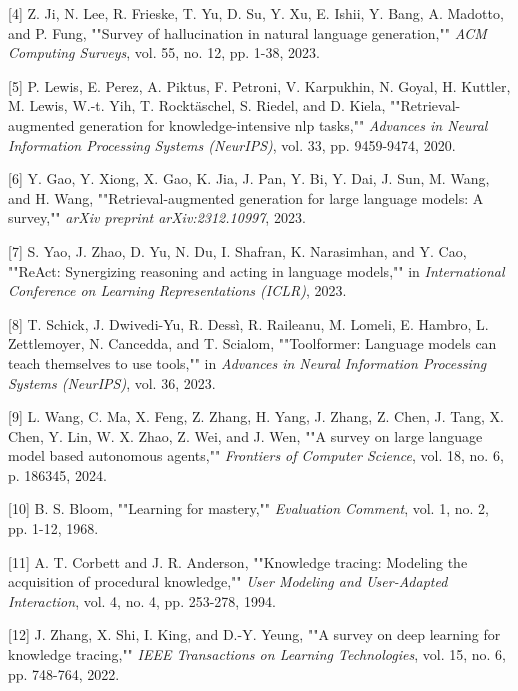 \documentclass[12pt,a4paper]{article}
\begin{document}
{[}4{]}	Z. Ji, N. Lee, R. Frieske, T. Yu, D. Su, Y. Xu, E. Ishii, Y. Bang, A. Madotto, and P. Fung, ""Survey of hallucination in natural language generation,"" \textit{ACM Computing Surveys}, vol. 55, no. 12, pp. 1-38, 2023.



{[}5{]}	P. Lewis, E. Perez, A. Piktus, F. Petroni, V. Karpukhin, N. Goyal, H. Kuttler, M. Lewis, W.-t. Yih, T. Rocktäschel, S. Riedel, and D. Kiela, ""Retrieval-augmented generation for knowledge-intensive nlp tasks,"" \textit{Advances in Neural Information Processing Systems (NeurIPS)}, vol. 33, pp. 9459-9474, 2020.



{[}6{]}	Y. Gao, Y. Xiong, X. Gao, K. Jia, J. Pan, Y. Bi, Y. Dai, J. Sun, M. Wang, and H. Wang, ""Retrieval-augmented generation for large language models: A survey,"" \textit{arXiv preprint arXiv:2312.10997}, 2023.



{[}7{]}	S. Yao, J. Zhao, D. Yu, N. Du, I. Shafran, K. Narasimhan, and Y. Cao, ""ReAct: Synergizing reasoning and acting in language models,"" in \textit{International Conference on Learning Representations (ICLR)}, 2023.



{[}8{]}	T. Schick, J. Dwivedi-Yu, R. Dessì, R. Raileanu, M. Lomeli, E. Hambro, L. Zettlemoyer, N. Cancedda, and T. Scialom, ""Toolformer: Language models can teach themselves to use tools,"" in \textit{Advances in Neural Information Processing Systems (NeurIPS)}, vol. 36, 2023.



{[}9{]}	L. Wang, C. Ma, X. Feng, Z. Zhang, H. Yang, J. Zhang, Z. Chen, J. Tang, X. Chen, Y. Lin, W. X. Zhao, Z. Wei, and J. Wen, ""A survey on large language model based autonomous agents,"" \textit{Frontiers of Computer Science}, vol. 18, no. 6, p. 186345, 2024.



{[}10{]}	B. S. Bloom, ""Learning for mastery,"" \textit{Evaluation Comment}, vol. 1, no. 2, pp. 1-12, 1968.



{[}11{]}	A. T. Corbett and J. R. Anderson, ""Knowledge tracing: Modeling the acquisition of procedural knowledge,"" \textit{User Modeling and User-Adapted Interaction}, vol. 4, no. 4, pp. 253-278, 1994.



{[}12{]}	J. Zhang, X. Shi, I. King, and D.-Y. Yeung, ""A survey on deep learning for knowledge tracing,"" \textit{IEEE Transactions on Learning Technologies}, vol. 15, no. 6, pp. 748-764, 2022.
\end{document}
